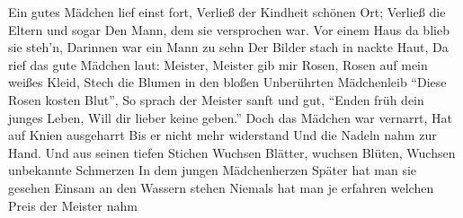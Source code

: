 \beginverse
Ein gutes Mädchen lief einst fort,
Verließ der Kindheit schönen Ort;
Verließ die Eltern und sogar
Den Mann, dem sie versprochen war.
Vor einem Haus da blieb sie steh'n,
Darinnen war ein Mann zu sehn
Der Bilder stach in nackte Haut,
Da rief das gute Mädchen laut:
\endverse
\beginchorus
Meister, Meister gib mir Rosen,
Rosen auf mein weißes Kleid,
Stech die Blumen in den bloßen
Unberührten Mädchenleib
\endchorus
\beginverse
``Diese Rosen kosten Blut'',
So sprach der Meister sanft und gut,
``Enden früh dein junges Leben,
Will dir lieber keine geben.''
Doch das Mädchen war vernarrt,
Hat auf Knien ausgeharrt
Bis er nicht mehr widerstand
Und die Nadeln nahm zur Hand.
\endverse
{}
\beginverse*
Und aus seinen tiefen Stichen
Wuchsen Blätter, wuchsen Blüten,
Wuchsen unbekannte Schmerzen
In dem jungen Mädchenherzen
Später hat man sie gesehen
Einsam an den Wassern stehen
Niemals hat man je erfahren
welchen Preis der Meister nahm
\endverse
{}
\endsong

